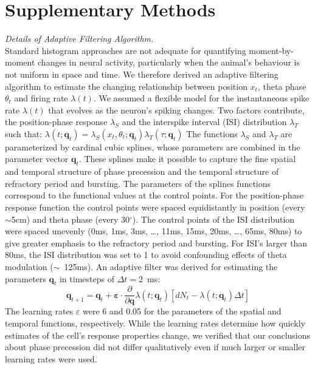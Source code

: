 \documentclass[preprint,rmp,preprintnumbers,floatfix]{revtex4}
\newcommand{\dd}[1]{\frac{\partial}{\partial #1}}
\begin{document}





\section*{\large Supplementary Methods}

{\it Details of Adaptive Filtering Algorithm.}\\

Standard histogram approaches are not adequate for quantifying moment-by-moment
changes in neural activity, particularly when the animal's behaviour is not
uniform in space and time.  We therefore derived an adaptive filtering
algorithm \cite{Brown2001,Frank2002} to estimate the changing
relationship between position $x_t$, theta phase $\theta_t$ and firing rate
$\lambda(t)$.  
%
We assumed a flexible model for the instantaneous spike rate $\lambda(t)$ that
evolves as the neuron's spiking changes. Two factors contribute, the
position-phase response $\lambda_S$ and the interspike interval (ISI)
distribution $\lambda_T$ such that:
$\lambda(t;\mathbf{q}_t)= 
\lambda_S(x_t,\theta_t;\mathbf{q}_t) \lambda_T(\tau;\mathbf{q}_t)$
%
The functions $\lambda_S$ and $\lambda_T$ are parameterized by
cardinal cubic splines, whose parameters are combined in the parameter vector
$\mathbf{q}_t$. These splines make it possible to capture the fine spatial and
temporal structure of phase precession and the temporal structure of refractory
period and bursting.  
%
The parameters of the splines functions correspond to the
functional values at the control points. For the position-phase response
function the control points were spaced equidistantly in position (every
$\sim$5cm) and theta phase (every 30$^\circ$). The control points of the ISI
distribution were spaced unevenly (0ms, 1ms, 3ms, \dots , 11ms, 15ms, 20ms,
\dots , 65ms, 80ms) to give greater emphasis to the refractory period and
bursting. For ISI's larger than 80ms, the ISI distribution was set to 1 to avoid
confounding effects of theta modulation ($\sim$~125ms). An adaptive filter was
derived for estimating the parameters
$\mathbf{q}_t$ in timesteps of $\Delta t=2$~ms:
\begin{equation}
    \mathbf{q}_{t+1}= \mathbf{q}_{t} + \mathbf{\varepsilon} \cdot 
    \dd{\mathbf{q}} \lambda(t;\mathbf{q}_t) \left[ dN_t -
    \lambda(t;\mathbf{q}_t) \Delta t \right]
\end{equation}
The learning rates $\varepsilon$ were 6 and 0.05 for the parameters of the
spatial and temporal functions, respectively.  While the learning rates
determine how quickly estimates of the cell's response properties change, we
verified that our conclusions about phase precession did not differ
qualitatively even if much larger or smaller learning rates were used.
\\
\end{document}
